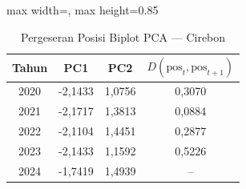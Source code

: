 \begin{table}[H]
\centering
\caption{Pergeseran Posisi Biplot PCA --- Cirebon} \label{tab:appjarak_pca_skor_cirebon}
\begin{adjustbox}{max width=\textwidth, max height=0.85\textheight}
\begin{tabular}{|c|c|c|c|}
\hline
\textbf{Tahun} & \textbf{PC1} & \textbf{PC2} & \textbf{$D(\text{pos}_t, \text{pos}_{t+1})$} \\
\hline
2020 & -2,1433 & 1,0756 & 0,3070 \\
2021 & -2,1717 & 1,3813 & 0,0884 \\
2022 & -2,1104 & 1,4451 & 0,2877 \\
2023 & -2,1433 & 1,1592 & 0,5226 \\
2024 & -1,7419 & 1,4939 & -- \\
\hline
\end{tabular}
\end{adjustbox}
\end{table}